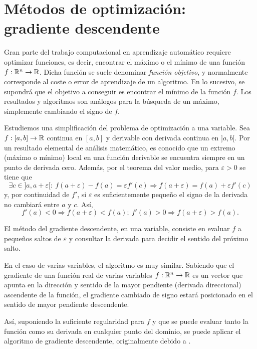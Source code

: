 \section{Métodos de optimización: gradiente
descendente}

\label{sec:grad-desc}

Gran parte del trabajo computacional en aprendizaje automático requiere
optimizar funciones, es decir, encontrar el máximo o el mínimo de una
función \(f:\mathbb{R}^n\rightarrow \mathbb{R}\). Dicha función se suele denominar
\emph{función objetivo}, y normalmente corresponde al coste o error de
aprendizaje de un algoritmo. En lo sucesivo, se supondrá que el objetivo
a conseguir es encontrar el mínimo de la función \(f\). Los resultados y
algoritmos son análogos para la búsqueda de un máximo, simplemente
cambiando el signo de \(f\).

Estudiemos una simplificación del problema de optimización a una
variable. Sea \(f:[a,b]\rightarrow\mathbb{R}\) continua en \([a,b]\) y
derivable con derivada continua en \(]a,b[\). Por un resultado elemental
de análisis matemático, es conocido que un extremo (máximo o mínimo)
local en una función derivable se encuentra siempre en un punto de
derivada cero. Además, por el teorema del valor medio, para
\(\varepsilon>0\) se tiene que
\[\exists c\in ]a, a+\varepsilon[ :\ f(a+\varepsilon)-f(a)=\varepsilon f'(c)\Rightarrow f(a+\varepsilon)=f(a) + \varepsilon f'(c)\]
y, por continuidad de \(f'\), si \(\varepsilon\) es suficientemente
pequeño el signo de la derivada no cambiará entre \(a\) y \(c\). Así,
\[f'(a)<0\Rightarrow f(a+\varepsilon) < f(a);\ f'(a)>0\Rightarrow f(a+\varepsilon) > f(a).\]

El método del gradiente descendente, en una variable, consiste en
evaluar \(f\) a pequeños saltos de \(\varepsilon\) y consultar la
derivada para decidir el sentido del próximo salto.

En el caso de varias variables, el algoritmo es muy similar. Sabiendo
que el gradiente de una función real de varias variables
\(f:\mathbb{R}^n\rightarrow \mathbb{R}\) es un vector que apunta en la dirección y
sentido de la mayor pendiente (derivada direccional) ascendente de la
función, el gradiente cambiado de signo estará posicionado en el sentido
de mayor pendiente descendente.

Así, suponiendo la suficiente regularidad para \(f\) y que se puede
evaluar tanto la función como su derivada en cualquier punto del
dominio, se puede aplicar el algoritmo de gradiente descendente,
originalmente debido a \textcite{cauchy1847}.

